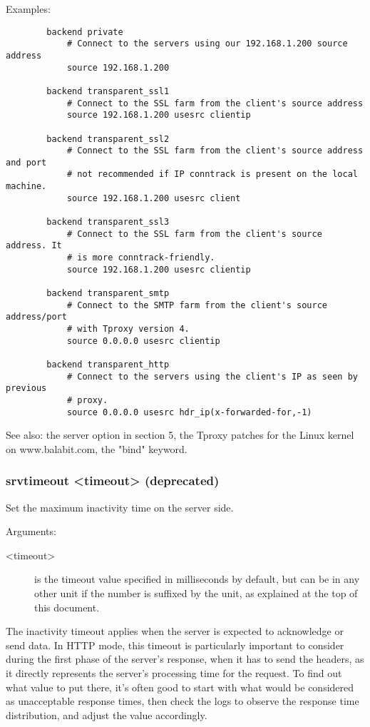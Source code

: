   Examples:
  \begin{verbatim}
        backend private
            # Connect to the servers using our 192.168.1.200 source address
            source 192.168.1.200

        backend transparent_ssl1
            # Connect to the SSL farm from the client's source address
            source 192.168.1.200 usesrc clientip

        backend transparent_ssl2
            # Connect to the SSL farm from the client's source address and port
            # not recommended if IP conntrack is present on the local machine.
            source 192.168.1.200 usesrc client

        backend transparent_ssl3
            # Connect to the SSL farm from the client's source address. It
            # is more conntrack-friendly.
            source 192.168.1.200 usesrc clientip

        backend transparent_smtp
            # Connect to the SMTP farm from the client's source address/port
            # with Tproxy version 4.
            source 0.0.0.0 usesrc clientip

        backend transparent_http
            # Connect to the servers using the client's IP as seen by previous
            # proxy.
            source 0.0.0.0 usesrc hdr_ip(x-forwarded-for,-1)
  \end{verbatim}

  See also: the  server option in section 5, the Tproxy patches for
             the Linux kernel on www.balabit.com, the "bind" keyword.

\subsubsection[srvtimeout]{srvtimeout <timeout> (deprecated)}


  Set the maximum inactivity time on the server side.


  Arguments:
  \begin{description}
  \item[<timeout>] is the timeout value specified in milliseconds by default, but
              can be in any other unit if the number is suffixed by the unit,
              as explained at the top of this document.
  \end{description}

  The inactivity timeout applies when the server is expected to acknowledge or
  send data. In HTTP mode, this timeout is particularly important to consider
  during the first phase of the server's response, when it has to send the
  headers, as it directly represents the server's processing time for the
  request. To find out what value to put there, it's often good to start with
  what would be considered as unacceptable response times, then check the logs
  to observe the response time distribution, and adjust the value accordingly.

